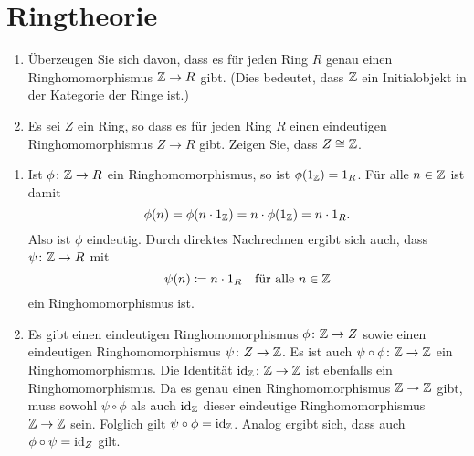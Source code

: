 \section{Ringtheorie}


\begin{question}[subtitle = Initialobjekte in der Kategorie der Ringe]
  \label{qst: Z is inital}
  \begin{enumerate}
    \item
      Überzeugen Sie sich davon, dass es für jeden Ring $R$ genau einen Ringhomomorphismus $\mathbb{Z} \to R$ gibt.
      (Dies bedeutet, dass $\mathbb{Z}$ ein Initialobjekt in der Kategorie der Ringe ist.)
    \item
      Es sei $Z$ ein Ring, so dass es für jeden Ring $R$ einen eindeutigen Ringhomomorphismus $Z \to R$ gibt.
      Zeigen Sie, dass $Z \cong \mathbb{Z}$.
  \end{enumerate}
\end{question}


\begin{solution}
  \begin{enumerate}
    \item
      Ist $\phi \colon \mathbb{Z} \to R$ ein Ringhomomorphismus, so ist $\phi(1_{\mathbb{Z}}) = 1_R$.
      Für alle $n \in \mathbb{Z}$ ist damit
      \[
          \phi(n)
        = \phi(n \cdot 1_{\mathbb{Z}})
        = n \cdot \phi(1_{\mathbb{Z}})
        = n \cdot 1_R.
      \]
      Also ist $\phi$ eindeutig.
      Durch direktes Nachrechnen ergibt sich auch, dass $\psi \colon \mathbb{Z} \to R$ mit
      \[
        \psi(n) \coloneqq n \cdot 1_R
        \quad
        \text{für alle $n \in \mathbb{Z}$}
      \]
      ein Ringhomomorphismus ist.
    \item
      Es gibt einen eindeutigen Ringhomomorphismus $\phi \colon \mathbb{Z} \to Z$ sowie einen eindeutigen Ringhomomorphismus $\psi \colon Z \to \mathbb{Z}$.
      Es ist auch $\psi \circ \phi \colon \mathbb{Z} \to \mathbb{Z}$ ein Ringhomomorphismus.
      Die Identität $\operatorname{id}_{\mathbb{Z}} \colon \mathbb{Z} \to \mathbb{Z}$ ist ebenfalls ein Ringhomomorphismus.
      Da es genau einen Ringhomomorphismus $\mathbb{Z} \to \mathbb{Z}$ gibt, muss sowohl $\psi \circ \phi$ als auch $\operatorname{id}_{\mathbb{Z}}$  dieser eindeutige Ringhomomorphismus $\mathbb{Z} \to \mathbb{Z}$ sein.
      Folglich gilt $\psi \circ \phi = \operatorname{id}_{\mathbb{Z}}$.
      Analog ergibt sich, dass auch $\phi \circ \psi = \operatorname{id}_Z$ gilt.
  \end{enumerate}
\end{solution}


